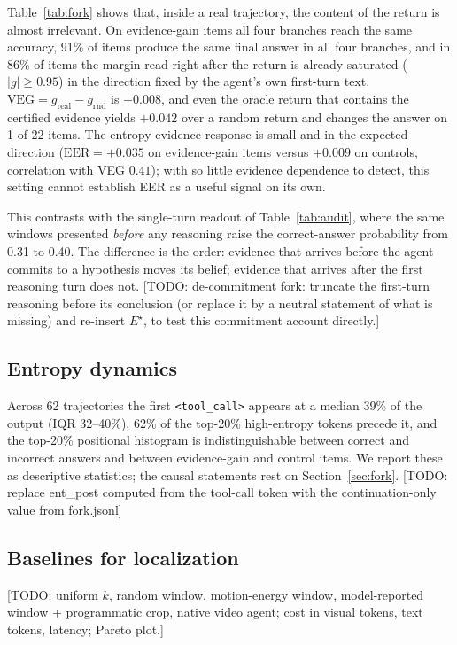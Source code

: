 \documentclass{article}
\newcommand{\todo}[1]{{\color{red}[TODO: #1]}}
\newcommand{\estar}{E^{\star}}
\begin{document}
Table~\ref{tab:fork} shows that, inside a real trajectory, the content of the return is almost irrelevant. On evidence-gain items all four branches reach the same accuracy, 91\% of items produce the same final answer in all four branches, and in 86\% of items the margin read right after the return is already saturated ($|g|\ge 0.95$) in the direction fixed by the agent's own first-turn text. $\mathrm{VEG}=g_{\mathrm{real}}-g_{\mathrm{rnd}}$ is $+0.008$, and even the oracle return that contains the certified evidence yields $+0.042$ over a random return and changes the answer on 1 of 22 items. The entropy evidence response is small and in the expected direction ($\mathrm{EER}=+0.035$ on evidence-gain items versus $+0.009$ on controls, correlation with VEG $0.41$); with so little evidence dependence to detect, this setting cannot establish EER as a useful signal on its own.

This contrasts with the single-turn readout of Table~\ref{tab:audit}, where the same windows presented \emph{before} any reasoning raise the correct-answer probability from 0.31 to 0.40. The difference is the order: evidence that arrives before the agent commits to a hypothesis moves its belief; evidence that arrives after the first reasoning turn does not. \todo{de-commitment fork: truncate the first-turn reasoning before its conclusion (or replace it by a neutral statement of what is missing) and re-insert $\estar$, to test this commitment account directly.}

\subsection{Entropy dynamics}
Across 62 trajectories the first \texttt{<tool\_call>} appears at a median 39\% of the output (IQR 32--40\%), 62\% of the top-20\% high-entropy tokens precede it, and the top-20\% positional histogram is indistinguishable between correct and incorrect answers and between evidence-gain and control items. We report these as descriptive statistics; the causal statements rest on Section~\ref{sec:fork}. \todo{replace ent\_post computed from the tool-call token with the continuation-only value from fork.jsonl}

\subsection{Baselines for localization}
\todo{uniform $k$, random window, motion-energy window, model-reported window + programmatic crop, native video agent; cost in visual tokens, text tokens, latency; Pareto plot.}
\end{document}
